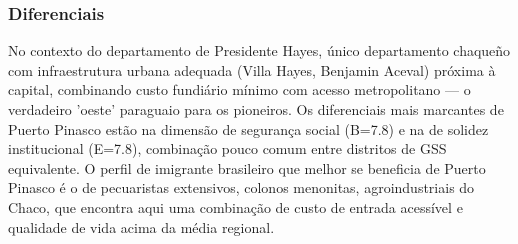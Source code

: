 \subsubsection*{Diferenciais}\label{dif-puerto-pinasco-1503}
No contexto do departamento de Presidente Hayes, único departamento chaqueño com infraestrutura urbana adequada (Villa Hayes, Benjamin Aceval) próxima à capital, combinando custo fundiário mínimo com acesso metropolitano — o verdadeiro 'oeste' paraguaio para os pioneiros. Os diferenciais mais marcantes de Puerto Pinasco estão na dimensão de segurança social (B=7.8) e na de solidez institucional (E=7.8), combinação pouco comum entre distritos de GSS equivalente. O perfil de imigrante brasileiro que melhor se beneficia de Puerto Pinasco é o de pecuaristas extensivos, colonos menonitas, agroindustriais do Chaco, que encontra aqui uma combinação de custo de entrada acessível e qualidade de vida acima da média regional.
